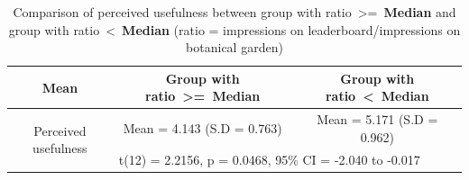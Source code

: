 \begin{table}[h!]
  \begin{center}
    \caption{Comparison of perceived usefulness between group with ratio~\textgreater=~\textbf{Median} and group with ratio~\textless~\textbf{Median} (ratio = impressions on leaderboard/impressions on botanical garden)}
    \label{table:pu_leaderboard_bias}
	\begin{tabular}{|c|c|c|}
		\hline
		Mean &Group with ratio~\textgreater=~\textbf{Median}&Group with ratio~\textless~\textbf{Median}\\
		\hline
		 \multirow{2}{*}{Perceived usefulness}&Mean = 4.143 (S.D = 0.763)&Mean = 5.171 (S.D = 0.962)\\\cline{2-3} 

		 &\multicolumn{2}{|l|}{t(12) = 2.2156, p = 0.0468, 95\% CI = -2.040  to  -0.017} \\
\hline
	\end{tabular}
  \end{center}
\end{table}

